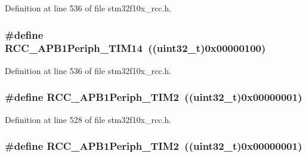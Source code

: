 Definition at line 536 of file stm32f10x\+\_\+rcc.\+h.

\subsubsection[{\texorpdfstring{R\+C\+C\+\_\+\+A\+P\+B1\+Periph\+\_\+\+T\+I\+M14}{RCC_APB1Periph_TIM14}}]{\setlength{\rightskip}{0pt plus 5cm}\#define R\+C\+C\+\_\+\+A\+P\+B1\+Periph\+\_\+\+T\+I\+M14~(({\bf uint32\+\_\+t})0x00000100)}\hypertarget{group___a_p_b1__peripheral_ga7100c45768eea1484f6fd519b53e287d}{}\label{group___a_p_b1__peripheral_ga7100c45768eea1484f6fd519b53e287d}


Definition at line 536 of file stm32f10x\+\_\+rcc.\+h.

\subsubsection[{\texorpdfstring{R\+C\+C\+\_\+\+A\+P\+B1\+Periph\+\_\+\+T\+I\+M2}{RCC_APB1Periph_TIM2}}]{\setlength{\rightskip}{0pt plus 5cm}\#define R\+C\+C\+\_\+\+A\+P\+B1\+Periph\+\_\+\+T\+I\+M2~(({\bf uint32\+\_\+t})0x00000001)}\hypertarget{group___a_p_b1__peripheral_ga742bab2f04cebe587574b53f7107aeaf}{}\label{group___a_p_b1__peripheral_ga742bab2f04cebe587574b53f7107aeaf}


Definition at line 528 of file stm32f10x\+\_\+rcc.\+h.

\subsubsection[{\texorpdfstring{R\+C\+C\+\_\+\+A\+P\+B1\+Periph\+\_\+\+T\+I\+M2}{RCC_APB1Periph_TIM2}}]{\setlength{\rightskip}{0pt plus 5cm}\#define R\+C\+C\+\_\+\+A\+P\+B1\+Periph\+\_\+\+T\+I\+M2~(({\bf uint32\+\_\+t})0x00000001)}\hypertarget{group___a_p_b1__peripheral_ga742bab2f04cebe587574b53f7107aeaf}{}\label{group___a_p_b1__peripheral_ga742bab2f04cebe587574b53f7107aeaf}


